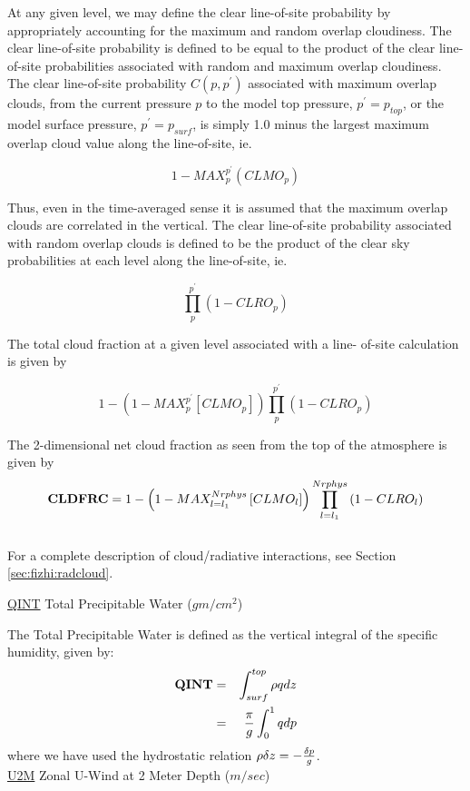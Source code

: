 At any given level, we may define the clear line-of-site probability by
appropriately accounting for the maximum and random overlap
cloudiness.  The clear line-of-site probability is defined to be
equal to the product of the clear line-of-site probabilities
associated with random and maximum overlap cloudiness.  The clear
line-of-site probability $C(p,p^{\prime})$ associated with maximum overlap clouds, 
from the current pressure $p$ 
to the model top pressure, $p^{\prime} = p_{top}$, or the model surface pressure, $p^{\prime} = p_{surf}$,
is simply 1.0 minus the largest maximum overlap cloud value along  the
line-of-site, ie.

$$1-MAX_p^{p^{\prime}} \left( CLMO_p \right)$$

Thus, even in the time-averaged sense it is assumed that the
maximum overlap clouds are correlated in the vertical.  The clear
line-of-site probability associated with random overlap clouds is
defined to be the product of the clear sky probabilities at each
level along the line-of-site, ie. 

$$\prod_{p}^{p^{\prime}} \left( 1-CLRO_p \right)$$

The total cloud fraction at a given level associated with a line-
of-site calculation is given by

$$1-\left( 1-MAX_p^{p^{\prime}} \left[ CLMO_p \right] \right)
    \prod_p^{p^{\prime}} \left( 1-CLRO_p \right)$$


\noindent
The 2-dimensional net cloud fraction as seen from the top of the
atmosphere is given by
\[
{\bf CLDFRC} = 1-\left( 1-MAX_{l=l_1}^{Nrphys} \left[ CLMO_l \right] \right)
    \prod_{l=l_1}^{Nrphys} \left( 1-CLRO_l \right)
\]
\\
For a complete description of cloud/radiative interactions, see Section \ref{sec:fizhi:radcloud}.


\noindent
{ \underline {QINT} Total Precipitable Water ($gm/cm^2$) }

\noindent
The Total Precipitable Water is defined as the vertical integral of the specific humidity,
given by:
\begin{eqnarray*}
{\bf QINT} & = & \int_{surf}^{top} \rho q dz \\
           & = & {\pi \over g} \int_0^1 q dp
\end{eqnarray*}
where we have used the hydrostatic relation 
$\rho \delta z = -{\delta p \over g} $.
\\


\noindent
{ \underline {U2M}  Zonal U-Wind at 2 Meter Depth ($m/sec$) }

